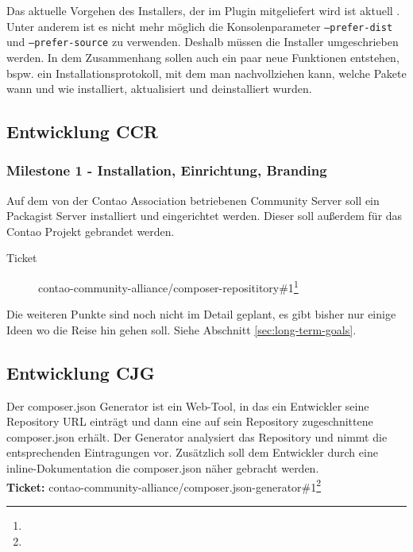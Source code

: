\documentclass[
paper=a4,
draft=false,%
fontsize=10pt%
]{scrartcl}
\begin{document}
Das aktuelle Vorgehen des Installers, der im Plugin mitgeliefert wird ist aktuell . Unter anderem ist es nicht mehr möglich die Konsolenparameter \texttt{--prefer-dist} und \texttt{--prefer-source} zu verwenden. Deshalb müssen die Installer umgeschrieben werden. In dem Zusammenhang sollen auch ein paar neue Funktionen entstehen, bspw. ein Installationsprotokoll, mit dem man nachvollziehen kann, welche Pakete wann und wie installiert, aktualisiert und deinstalliert wurden.

\subsection{Entwicklung CCR}
\label{subsec:ccr}

\subsubsection{Milestone 1 - Installation, Einrichtung, Branding}
\label{subsec:ccr-milestone-1}

Auf dem von der Contao Association betriebenen Community Server soll ein Packagist Server installiert und eingerichtet werden. Dieser soll außerdem für das Contao Projekt gebrandet werden.

\begin{description}
\item[Ticket] contao-community-alliance/composer-reposititory\#1\footnote{}
\end{description}

Die weiteren Punkte sind noch nicht im Detail geplant, es gibt bisher nur einige Ideen wo die Reise hin gehen soll. Siehe Abschnitt \ref{sec:long-term-goals}.

\subsection{Entwicklung CJG}
\label{subsec:cjg}

Der composer.json Generator ist ein Web-Tool, in das ein Entwickler seine Repository URL einträgt und dann eine auf sein Repository zugeschnittene composer.json erhält. Der Generator analysiert das Repository und nimmt die entsprechenden Eintragungen vor. Zusätzlich soll dem Entwickler durch eine inline-Dokumentation die composer.json näher gebracht werden.\\
\textbf{Ticket:} contao-community-alliance/composer.json-generator\#1\footnote{}
\end{document}
